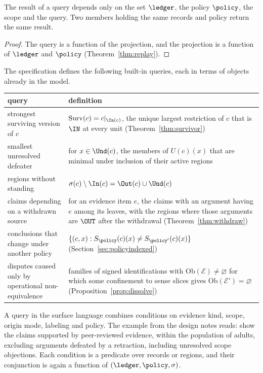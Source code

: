 \begin{proposition}\label{prop:querydet}
The result of a query depends only on the set $\ledger$, the policy $\policy$, the scope and the query. Two members holding the same records and policy return the same result.
\end{proposition}

\begin{proof}
The query is a function of the projection, and the projection is a function of $\ledger$ and $\policy$ (Theorem~\ref{thm:replay}).
\end{proof}

The specification defines the following built-in queries, each in terms of objects already in the model.

\begin{center}
\small
\begin{tabularx}{\textwidth}{@{}l X@{}}
\toprule
query & definition\\
\midrule
strongest surviving version of $c$ & $\mathrm{Surv}(c)=c|_{\In(c)}$, the unique largest restriction of $c$ that is $\IN$ at every unit (Theorem~\ref{thm:survivor})\\
smallest unresolved defeater & for $x\in\Und(c)$, the members of $U(c)(x)$ that are minimal under inclusion of their active regions\\
regions without standing & $\sigma(c)\setminus\In(c)=\Out(c)\cup\Und(c)$\\
claims depending on a withdrawn source & for an evidence item $e$, the claims with an argument having $e$ among its leaves, with the regions where those arguments are $\OUT$ after the withdrawal (Theorem~\ref{thm:withdraw})\\
conclusions that change under another policy & $\{(c,x): S_{\policy}(c)(x)\ne S_{\policy'}(c)(x)\}$ (Section~\ref{sec:policyindexed})\\
disputes caused only by operational non-equivalence & families of signed identifications with $\mathrm{Ob}(\mathcal E)\ne\varnothing$ for which some confinement to sense slices gives $\mathrm{Ob}(\mathcal E')=\varnothing$ (Proposition~\ref{prop:dissolve})\\
\bottomrule
\end{tabularx}
\end{center}

A query in the surface language combines conditions on evidence kind, scope, origin mode, labeling and policy. The example from the design notes reads: show the claims supported by peer-reviewed evidence, within the population of adults, excluding arguments defeated by a retraction, including unresolved scope objections. Each condition is a predicate over records or regions, and their conjunction is again a function of $(\ledger,\policy,\sigma)$.

